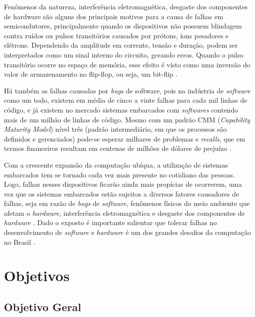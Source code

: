 Fenômenos da natureza, interferência eletromagnética, desgaste dos componentes de hardware \cite{Hsueh:1997} são alguns dos principais motivos para a causa de falhas em semicondutores, principalmente quando os dispositivos não possuem blindagem contra ruídos ou pulsos transitórios causados por prótons, íons pesadores e elétrons. Dependendo da amplitude em corrente, tensão e duração, podem ser interpretados como um sinal interno do circuito, gerando erros. Quando o pulso transitório ocorre no espaço de memória, esse efeito é visto como uma inversão do valor de armazenamento no flip-flop, ou seja, um bit-flip \cite{Ziegler:1996}. 

Há também as falhas causadas por \textit{bugs} de software, pois na indústria de \textit{software} como um todo, existem em média de cinco a vinte falhas para cada mil linhas de código, e já existem no mercado sistemas embarcados com \textit{softwares} contendo mais de um milhão de linhas de código. Mesmo com um padrão CMM (\textit {Capability Maturity Model}) nível três (padrão intermediário, em que os processos são definidos e gerenciados) \cite{Pressman:2005} pode-se esperar milhares de problemas e \textit{recalls}, que em termos financeiros resultam em centenas de milhões de dólares de prejuízo \cite{Taurion:2005}.

Com a crescente expansão da computação ubíqua, a utilização de sistemas embarcados tem se tornado cada vez mais presente no cotidiano das pessoas. Logo, falhas nesses dispositivos ficarão ainda mais propícias de ocorrerem, uma vez que os sistemas embarcados estão sujeitos a diversos fatores causadores de falhas, seja em razão de \textit{bugs} de \textit{software}, fenômenos físicos do meio ambiente que afetam o \textit{hardware}, interferência eletromagnética e desgaste dos componentes de \textit{hardware} \cite{Kruger:2014}. Dado o exposto é importante salientar que tolerar falhas no desenvolvimento de \textit{software} e \textit{hardware} é um dos grandes desafios da computação no Brasil \cite{Carvalho:2006}.


\section{Objetivos} \label{Sec:Objetivos}

\subsection{Objetivo Geral} \label{Sec:ObjetivoGeral}

